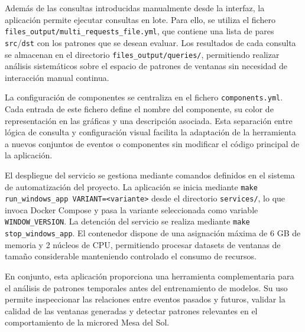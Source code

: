 Además de las consultas introducidas manualmente desde la interfaz, la aplicación permite ejecutar consultas en lote. Para ello, se utiliza el fichero \texttt{files\_output/multi\_requests\_file.yml}, que contiene una lista de pares \texttt{src}/\texttt{dst} con los patrones que se desean evaluar. Los resultados de cada consulta se almacenan en el directorio \texttt{files\_output/queries/}, permitiendo realizar análisis sistemáticos sobre el espacio de patrones de ventanas sin necesidad de interacción manual continua.

La configuración de componentes se centraliza en el fichero \texttt{components.yml}. Cada entrada de este fichero define el nombre del componente, su color de representación en las gráficas y una descripción asociada. Esta separación entre lógica de consulta y configuración visual facilita la adaptación de la herramienta a nuevos conjuntos de eventos o componentes sin modificar el código principal de la aplicación.

El despliegue del servicio se gestiona mediante comandos definidos en el sistema de automatización del proyecto. La aplicación se inicia mediante \texttt{make run\_windows\_app VARIANT=<variante>} desde el directorio \texttt{services/}, lo que invoca Docker Compose y pasa la variante seleccionada como variable \texttt{WINDOW\_VERSION}. La detención del servicio se realiza mediante \texttt{make stop\_windows\_app}. El contenedor dispone de una asignación máxima de 6 GB de memoria y 2 núcleos de CPU, permitiendo procesar datasets de ventanas de tamaño considerable manteniendo controlado el consumo de recursos.

En conjunto, esta aplicación proporciona una herramienta complementaria para el análisis de patrones temporales antes del entrenamiento de modelos. Su uso permite inspeccionar las relaciones entre eventos pasados y futuros, validar la calidad de las ventanas generadas y detectar patrones relevantes en el comportamiento de la microred Mesa del Sol.

